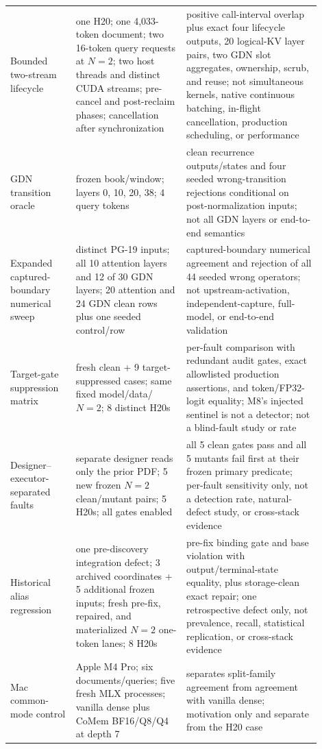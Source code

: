 \documentclass{article}
\begin{document}
\begin{longtable}{@{}>{\raggedright\arraybackslash}p{0.19\linewidth}>{\raggedright\arraybackslash}p{0.32\linewidth}>{\raggedright\arraybackslash}p{0.39\linewidth}@{}}
  Bounded two-stream lifecycle & one H20; one 4,033-token document; two 16-token query requests at $N=2$; two host threads and distinct CUDA streams; pre-cancel and post-reclaim phases; cancellation after synchronization & positive call-interval overlap plus exact four lifecycle outputs, 20 logical-KV layer pairs, two GDN slot aggregates, ownership, scrub, and reuse; not simultaneous kernels, native continuous batching, in-flight cancellation, production scheduling, or performance \\
  GDN transition oracle & 1 frozen book/window; layers 0, 10, 20, 38; 4 query tokens & clean recurrence outputs/states and four seeded wrong-transition rejections conditional on post-normalization inputs; not all GDN layers or end-to-end semantics \\
  Expanded captured-boundary numerical sweep & 2 distinct PG-19 inputs; all 10 attention layers and 12 of 30 GDN layers; 20 attention and 24 GDN clean rows plus one seeded control/row & captured-boundary numerical agreement and rejection of all 44 seeded wrong operators; not upstream-activation, independent-capture, full-model, or end-to-end validation \\
  Target-gate suppression matrix & 9 fresh clean + 9 target-suppressed cases; same fixed model/data/$N=2$; 8 distinct H20s & per-fault comparison with redundant audit gates, exact allowlisted production assertions, and token/FP32-logit equality; M8's injected sentinel is not a detector; not a blind-fault study or rate \\
  Designer--executor-separated faults & separate designer reads only the prior PDF; 5 new frozen $N=2$ clean/mutant pairs; 5 H20s; all gates enabled & all 5 clean gates pass and all 5 mutants fail first at their frozen primary predicate; per-fault sensitivity only, not a detection rate, natural-defect study, or cross-stack evidence \\
  Historical alias regression & one pre-discovery integration defect; 3 archived coordinates + 5 additional frozen inputs; fresh pre-fix, repaired, and materialized $N=2$ one-token lanes; 8 H20s & pre-fix binding gate and base violation with output/terminal-state equality, plus storage-clean exact repair; one retrospective defect only, not prevalence, recall, statistical replication, or cross-stack evidence \\
  Mac common-mode control & Apple M4 Pro; six documents/queries; five fresh MLX processes; vanilla dense plus CoMem BF16/Q8/Q4 at depth 7 & separates split-family agreement from agreement with vanilla dense; motivation only and separate from the H20 case \\

\end{longtable}
\end{document}
